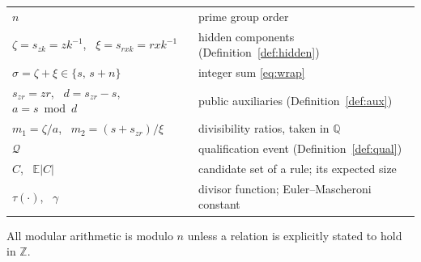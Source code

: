 \documentclass[11pt,a4paper]{article}
\theoremstyle{plain}
\theoremstyle{definition}
\theoremstyle{remark}
\newcommand{\Zz}{\mathbb{Z}}
\newcommand{\Qu}{\mathcal{Q}}
\newcommand{\Ex}{\mathbb{E}}
\newcommand{\szk}{s_{zk}}
\newcommand{\srxk}{s_{rxk}}
\newcommand{\szr}{s_{zr}}
\begin{document}
\noindent
\begin{tabular}{@{}ll@{}}
$n$ & prime group order\\
$\zeta = \szk = zk^{-1}$, \ $\xi = \srxk = rxk^{-1}$ & hidden components (Definition~\ref{def:hidden})\\
$\sigma = \zeta + \xi \in \{s,\,s+n\}$ & integer sum \eqref{eq:wrap}\\
$\szr = zr$, \ $d = \szr - s$, \ $a = s \bmod d$ & public auxiliaries (Definition~\ref{def:aux})\\
$m_1 = \zeta/a$, \ $m_2 = (s+\szr)/\xi$ & divisibility ratios, taken in $\mathbb{Q}$\\
$\Qu$ & qualification event (Definition~\ref{def:qual})\\
$C$, \ $\Ex|C|$ & candidate set of a rule; its expected size\\
$\tau(\cdot)$, \ $\gamma$ & divisor function; Euler--Mascheroni constant\\
\end{tabular}

\medskip\noindent
All modular arithmetic is modulo $n$ unless a relation is explicitly stated to hold in $\Zz$.
\end{document}
